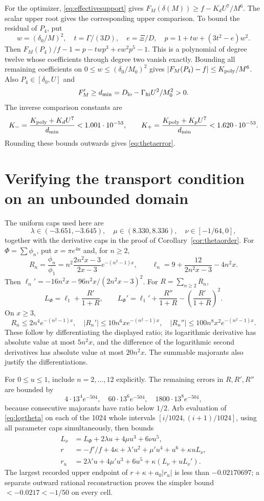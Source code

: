 For the optimizer, \eqref{eq:effectivesupport} gives
\(F_M(\delta(M))\geq f-K_dU^7/M^6\).
The scalar upper root gives the corresponding upper comparison.
To bound the residual of \(P_4\), put
\[
 w=(\delta_0/M)^2,\quad t=\Gamma/(3D),\quad e=\Xi/D,\quad
 p=1+tw+(3t^2-e)w^2 .
\]
Then \(F_M(P_4)/f-1=p-twp^3+ew^2p^5-1\).
This is a polynomial of degree twelve whose coefficients through
degree two vanish exactly. Bounding all remaining coefficients on
\(0\leq w\leq(\delta_0/M_0)^2\) gives
\(|F_M(P_4)-f|\leq K_{\rm poly}/M^6\).
Also \(P_4\in[\delta_0,U]\) and
\[
 F_M'\geq d_{\min}=D_{\rm lo}-\Gamma_{\rm hi}U^2/M_0^2>0 .
\]
The inverse comparison constants are
\[
 K_-=\frac{K_{\rm poly}+K_dU^7}{d_{\min}}<1.001\cdot10^{-53},
 \qquad
 K_+=\frac{K_{\rm poly}+K_pU^7}{d_{\min}}<1.620\cdot10^{-53}.
\]
Rounding these bounds outwards gives \eqref{eq:thetaerror}.

\section{Verifying the transport condition on an unbounded domain}
\label{app:transport}
The uniform caps used here are
\[
 \lambda\in(-3.651,-3.645),\quad\mu\in(8.330,8.336),\quad
 \nu\in[-1/64,0],
\]
together with the derivative caps in the proof of
Corollary~\ref{cor:thetaorder}. For \(\Phi=\sum\phi_n\), put
\(x=\pi e^{4u}\) and, for \(n\geq2\),
\[
 R_n=\frac{\phi_n}{\phi_1}
 =n^2\frac{2n^2x-3}{2x-3}e^{-(n^2-1)x},\qquad
 \ell_n=9+\frac{12}{2n^2x-3}-4n^2x.
\]
Then \(\ell_n'=-16n^2x-96n^2x/(2n^2x-3)^2\).
For \(R=\sum_{n\geq2}R_n\),
\begin{equation}\label{eq:logtheta}
 L_\Phi=\ell_1+\frac{R'}{1+R},\qquad
 L_\Phi'=\ell_1'+\frac{R''}{1+R}
                      -\left(\frac{R'}{1+R}\right)^2 .
\end{equation}
On \(x\geq3\),
\[
 R_n\leq2n^4e^{-(n^2-1)x},\quad
 |R_n'|\leq10n^6xe^{-(n^2-1)x},\quad
 |R_n''|\leq100n^8x^2e^{-(n^2-1)x}.
\]
These follow by differentiating the displayed ratio; its logarithmic
derivative has absolute value at most \(5n^2x\), and the difference
of the logarithmic second derivatives has absolute value at most
\(20n^2x\). The summable majorants also justify the differentiations.

For \(0\leq u\leq1\), include \(n=2,\ldots,12\) explicitly.
The remaining errors in \(R,R',R''\) are bounded by
\[
 4\cdot13^4e^{-504},\quad60\cdot13^6e^{-504},\quad
 1800\cdot13^8e^{-504},
\]
because consecutive majorants have ratio below \(1/2\).
Arb evaluation of \eqref{eq:logtheta} on each of the 1024 whole
intervals \([i/1024,(i+1)/1024]\), using all parameter caps simultaneously,
then bounds
\begin{align*}
 L_\nu&=L_\Phi+2\lambda u+4\mu u^3+6\nu u^5,\\
 r&=-f'/f+4\kappa+\lambda'u^2+\mu'u^4+u^6+\kappa uL_\nu,\\
 r_u&=2\lambda'u+4\mu'u^3+6u^5+\kappa(L_\nu+uL_\nu').
\end{align*}
The largest recorded upper endpoint of \(r+\kappa+a_0|r_u|\) is
less than \(-0.02170697\); a separate outward rational reconstruction
proves the simpler bound \(<-0.0217<-1/50\) on every cell.

